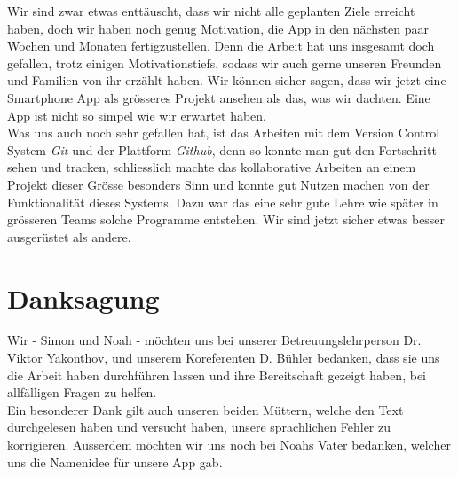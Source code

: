 \documentclass[a4paper,11pt]{article}
\renewcommand{\listoffigures}{\begingroup
\tocsection
\tocfile{\listfigurename}{lof}
\endgroup}
\begin{document}
Wir sind zwar etwas enttäuscht, dass wir nicht alle geplanten Ziele erreicht haben, doch wir haben noch genug Motivation, die App in den nächsten paar Wochen und Monaten fertigzustellen. Denn die Arbeit hat uns insgesamt doch gefallen, trotz einigen Motivationstiefs, sodass wir auch gerne unseren Freunden und Familien von ihr erzählt haben.
Wir können sicher sagen, dass wir jetzt eine Smartphone App als grösseres Projekt ansehen als das, was wir dachten. Eine App ist nicht so simpel wie wir erwartet haben.\\

Was uns auch noch sehr gefallen hat, ist das Arbeiten mit dem Version Control System \textit{Git} und der Plattform \textit{Github}, denn so konnte man gut den Fortschritt sehen und tracken, schliesslich machte das kollaborative Arbeiten an einem Projekt dieser Grösse besonders Sinn und konnte gut Nutzen machen von der Funktionalität dieses Systems.
Dazu war das eine sehr gute Lehre wie später in grösseren Teams solche Programme entstehen. Wir sind jetzt sicher etwas besser ausgerüstet als andere.

\section{Danksagung}
Wir - Simon und Noah - möchten uns bei unserer Betreuungslehrperson Dr. Viktor Yakonthov, und unserem Koreferenten D. Bühler bedanken, dass sie uns die Arbeit haben durchführen lassen und ihre Bereitschaft gezeigt haben, bei allfälligen Fragen zu helfen.\\

Ein besonderer Dank gilt auch unseren beiden Müttern, welche den Text durchgelesen haben und versucht haben, unsere sprachlichen Fehler zu korrigieren. Ausserdem möchten wir uns noch bei Noahs Vater bedanken, welcher uns die Namenidee für unsere App gab.

\clearpage
\printglossary

\newpage
\printbibliography[heading=bibnumbered, title={Literaturverzeichnis}]

\listoffigures
\end{document}
